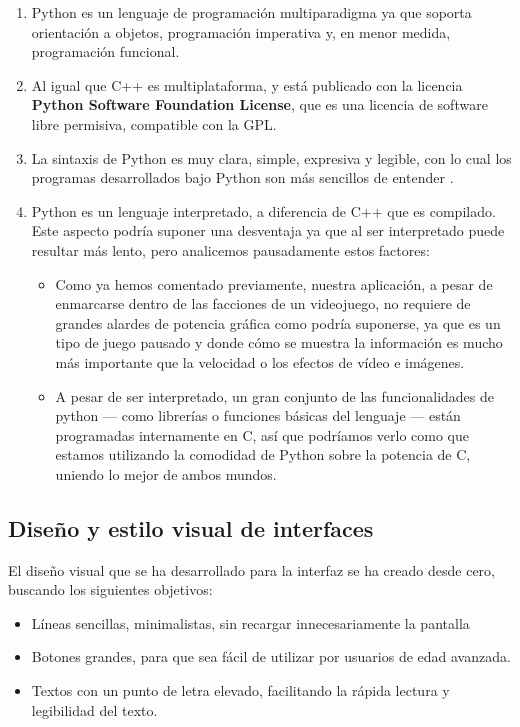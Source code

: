\begin{enumerate}
    \item Python es un lenguaje de programación multiparadigma ya que soporta orientación a objetos,
            programación imperativa y, en menor medida, programación funcional.
    \item Al igual que C++ es multiplataforma, y está publicado con la licencia \textbf{Python Software Foundation
            License}, que es una licencia de software libre permisiva, compatible con la GPL.
    \item La sintaxis de Python es muy clara, simple, expresiva y legible, con lo cual los programas
            desarrollados bajo Python son más sencillos de entender \cite{Pilgrim:2004:DP:983200}.
    \item Python es un lenguaje interpretado, a diferencia de C++ que es compilado. Este aspecto podría suponer una
            desventaja ya que al ser interpretado puede resultar más lento, pero analicemos pausadamente estos
            factores:
        \begin{itemize}
            \item Como ya hemos comentado previamente, nuestra aplicación, a pesar de enmarcarse dentro de las
                    facciones de un videojuego, no requiere de grandes alardes de potencia gráfica como podría
                    suponerse, ya que es un tipo de juego pausado y donde cómo se muestra la información
                    es mucho más importante que la velocidad o los efectos de vídeo e imágenes.
            \item A pesar de ser interpretado, un gran conjunto de las funcionalidades de python --- como librerías o
                    funciones básicas del lenguaje --- están programadas internamente en C, así que podríamos
                    verlo como que estamos utilizando la comodidad de Python sobre la potencia de C, uniendo
                    lo mejor de ambos mundos.
        \end{itemize}
\end{enumerate}

\subsection{Diseño y estilo visual de interfaces}

El diseño visual que se ha desarrollado para la interfaz se ha creado desde cero, buscando los siguientes objetivos:
\begin{itemize}
    \item Líneas sencillas, minimalistas, sin recargar innecesariamente la pantalla
    \item Botones grandes, para que sea fácil de utilizar por usuarios de edad avanzada.
    \item Textos con un punto de letra elevado, facilitando la rápida lectura y legibilidad del texto.
\end{itemize}

